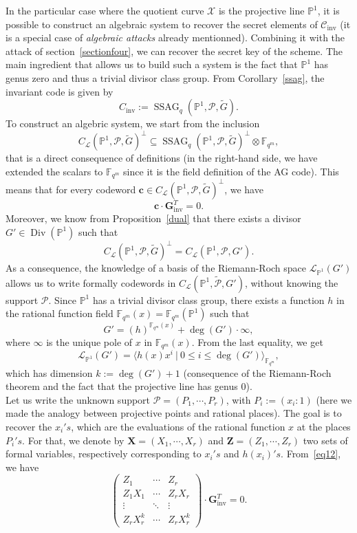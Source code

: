 \documentclass[10pt]{article}
\theoremstyle{definition}
\theoremstyle{definition}
\theoremstyle{definition}
\newcommand{\cd}{\cdot}
\newcommand{\C}{\mathcal{C}}
\newcommand{\PP}{\mathbb{P}}
\newcommand{\Fqm}{\mathbb{F}_{q^m}}
\newcommand{\su}{\subseteq}
\newcommand{\X}{\mathcal{X}}
\newcommand{\PR}{\mathcal{P}}
\newcommand{\Div}{\operatorname{Div}}
\newcommand{\ssag}{\operatorname{SSAG}}
\newcommand{\calL}{\mathcal{L}}
\begin{document}
In the particular case where the quotient curve $\X$ is the projective line $\PP^1$, it is possible to construct an algebraic system to recover the secret elements of $\C_{\mathrm{inv}}$ (it is a special case of \textit{algebraic attacks} already mentionned). Combining it with the attack of section~\ref{sectionfour}, we can  recover the secret key of the scheme. The main ingredient that allows us to build such a system is the fact that $\PP^1$ has genus zero and thus a trivial divisor class group. 
From Corollary~\ref{ssag}, the invariant code is given by 
\[C_{\mathrm{inv}} := \ssag_q(\PP^1,\PR,\tilde{G}).\]
To construct an algebric system, we start from the inclusion 
\[C_{\calL}(\PP^1,\PR,\tilde{G})^{\perp} \su \ssag_q(\PP^1,\PR,\tilde{G})^{\perp} \otimes \Fqm,\]
that is a direct consequence of definitions (in the right-hand side, we have extended the scalars to $\Fqm$ since it is the field definition of the AG code). This means that for every codeword $\mathbf{c} \in C_{\calL}(\PP^1,\PR,\tilde{G})^{\perp}$, we have 
\begin{equation} \label{eq12}
\mathbf{c} \cd \mathbf{G}_{\mathrm{inv}}^T = 0.
\end{equation} 
Moreover, we know from Proposition~\ref{dual} that there exists a divisor $G' \in \Div(\PP^1)$ such that
\[ C_{\calL}(\PP^1,\PR,\tilde{G})^{\perp} = C_{\calL}(\PP^1,\PR,G').\]
As a consequence, the knowledge of a basis of the Riemann-Roch space $\calL_{\mathbb{P}^1}(G')$ allows us to write formally codewords in $C_{\calL}(\PP^1,\tilde{\PR},G')$, without knowing the support $\PR$. Since $\PP^1$ has a trivial divisor class group, there exists a function $h$ in the rational function field $\Fqm(x) = \Fqm(\PP^1)$ such that
\[ G' = (h)^{\Fqm(x)} + \deg(G') \cd \infty,\]
where $\infty$ is the unique pole of $x$ in $\Fqm(x)$. From the last equality, we get
\[\calL_{\mathbb{P}^1}(G') = \langle h(x)x^i \ | \ 0 \leq i \leq \deg(G')\rangle_{\Fqm},\]
which has dimension $k:=\deg(G')+1$ (consequence of the Riemann-Roch theorem and the fact that the projective line has genus $0$). \\
Let us write the unknown support $\PR = (P_1,\cdots,P_r)$, with $P_i := (x_i:1)$ (here we made the analogy between projective points and rational places). The goal is to recover the $x_i's$, which are the evaluations of the rational function $x$ at the places $P_i's$. For that, we denote by  
$\mathbf{X} = (X_1,\cdots,X_r)$ and $\mathbf{Z} = (Z_1,\cdots,Z_r)$ two sets of formal variables, respectively corresponding to $x_i's$ and $h(x_i)'s$. From~\eqref{eq12}, we have
\begin{equation} \label{system_over_P1}
\begin{pmatrix}
Z_1 & \cdots & Z_r \\
Z_1X_1 & \cdots & Z_{r}X_{r} \\
\vdots & \ddots & \vdots \\
Z_rX_r^{k} & \cdots & Z_{r}X_{r}^k 
\end{pmatrix}
\cd \mathbf{G}_{\mathrm{inv}}^T= 0.
\end{equation}
\end{document}
